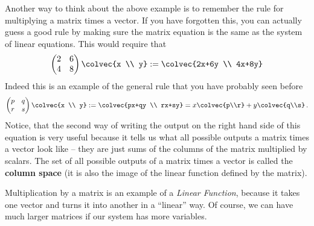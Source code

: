 Another way to think about the above example is to remember the rule for multiplying a matrix times a vector.
\hypertarget{system2matrix}{If} you have forgotten this, you can actually  guess a good rule by making sure the matrix equation is the same as the system of linear equations.
This would require that
\[
 \begin{pmatrix}
      2     & 6 \\
      4     & 8
    \end{pmatrix}
  \colvec{x \\ y}
  :=   \colvec{2x+6y \\ 4x+8y}
\]
Indeed this is an example of
\hypertarget{ch1vecmult}{the general rule} that you have probably seen before
\begin{equation*}\label{2x2multiplication}
    \begin{pmatrix}
      p     & q  \\
      r      & s
    \end{pmatrix}
  \colvec{x \\ y}
  :=
  \colvec{px+qy \\ rx+sy}=x\colvec{p\\r} + y\colvec{q\\s}\, .
\end{equation*}
Notice, that the second way of writing the output on the right hand side of this equation is very useful because it
tells us what all possible outputs a matrix times a vector look like -- they are just sums of the columns of the matrix
multiplied by scalars. The set of all possible outputs of a matrix times a vector is called 
the {\bf column space} (it is also the image of the linear function defined by the matrix).


 


\noindent
Multiplication by 
\hypertarget{earlier}{a matrix} is an example of a \emph{Linear Function}, because it takes one vector and turns it into another in a ``linear'' way.
Of course, we can have much larger matrices if our system has more variables.


